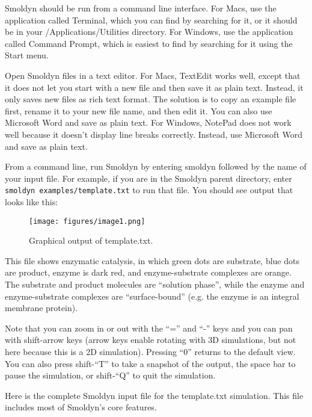 \documentclass {scrbook}
\newcommand {\ttt} {\texttt}
\begin{document}
Smoldyn should be run from a command line interface. For Macs, use the application called Terminal, which you can find by searching for it, or it should be in your /Applications/Utilities directory. For Windows, use the application called Command Prompt, which is easiest to find by searching for it using the Start menu.

Open Smoldyn files in a text editor. For Macs, TextEdit works well, except that it does not let you start with a new file and then save it as plain text. Instead, it only saves new files as rich text format. The solution is to copy an example file first, rename it to your new file name, and then edit it. You can also use Microsoft Word and save as plain text. For Windows, NotePad does not work well because it doesn't display line breaks correctly. Instead, use Microsoft Word and save as plain text.

From a command line, run Smoldyn by entering smoldyn followed by the name of your input file. For example, if you are in the Smoldyn parent directory, enter  \ttt{smoldyn examples/template.txt} to run that file. You should see output that looks like this:

\begin{figure}[h]
\centering
\texttt{[image: figures/image1.png]}
\caption{Graphical output of template.txt.}
\label{fig:template}
\end{figure}

This file shows enzymatic catalysis, in which green dots are substrate, blue dots are product, enzyme is dark red, and enzyme-substrate complexes are orange. The substrate and product molecules are ``solution phase'', while the enzyme and enzyme-substrate complexes are ``surface-bound'' (e.g. the enzyme is an integral membrane protein).

Note that you can zoom in or out with the ``='' and ``-'' keys and you can pan with shift-arrow keys (arrow keys enable rotating with 3D simulations, but not here because this is a 2D simulation). Pressing ``0'' returns to the default view. You can also press shift-``T'' to take a snapshot of the output, the space bar to pause the simulation, or shift-``Q'' to quit the simulation.

Here is the complete Smoldyn input file for the template.txt simulation. This file includes most of Smoldyn's core features.
\end{document}
